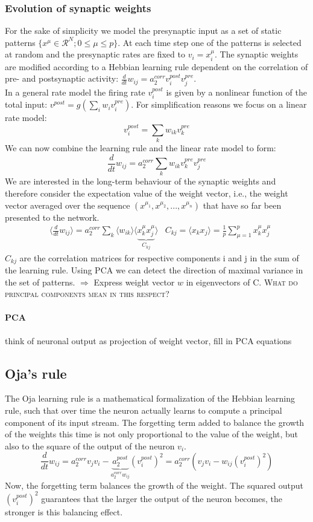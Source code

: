 \documentclass[11pt]{article}
\begin{document}
\subsubsection{Evolution of synaptic weights} For the sake of simplicity we model the presynaptic input as a set of static patterns $\{x^\mu \in \mathcal{R}^N; 0\leq \mu \leq p\}$. At each time step one of the patterns is selected at random and the presynaptic rates are fixed to $v_i = x_i^\mu$. The synaptic weights are modified according to a Hebbian learning rule dependent on the correlation of pre- and postsynaptic activity: $\frac{d}{dt}w_{ij}=a_2^{corr}v_i^{post}v_j^{pre}$.\\
In a general rate model the firing rate $v_i^{post}$ is given by a nonlinear function of the total input: $v^{post}=g(\sum_i w_i v_i^{pre})$. For simplification reasons we focus on a linear rate model: 
\[
v_i^{post}=\sum_k w_{ik} v_k^{pre}
\]
We can now combine the learning rule and the linear rate model to form:
\[
\frac{d}{dt}w_{ij}=a_2^{corr} \sum_k w_{ik} v_k^{pre} v_j^{pre}
\]
We are interested in the long-term behaviour of the synaptic weights and therefore consider the expectation value of the weight vector, i.e., the weight vector averaged over the sequence $(x^{\mu_1}, x^{\mu_2}, ..., x^{\mu_n})$ that have so far been presented to the network.
\begin{align*}
&\langle \frac{d}{dt}w_{ij} \rangle = a_2^{corr}\sum_k \langle w_{ik} \rangle \langle \underbrace{x_k^\mu x_j^\mu}_{C_{kj}} \rangle
&C_{kj}=\langle x_kx_j \rangle = \frac{1}{p}\sum_{\mu=1}^p x_k^\mu x_j^\mu
\end{align*}
$C_{kj}$ are the correlation matrices for respective components i and j in the sum of the learning rule. Using PCA we can detect the direction of maximal variance in the set of patterns. $\Rightarrow$ Express weight vector $w$ in eigenvectors of C. \textsc{What do principal components mean in this respect?}
\paragraph{PCA} think of neuronal output as projection of weight vector, fill in PCA equations
\subsection{Oja's rule}
The Oja learning rule is a mathematical formalization of the Hebbian learning rule, such that over time the neuron actually learns to compute a principal component of its input stream. The forgetting term added to balance the growth of the weights this time is not only proportional to the value of the weight, but also to the square of the output of the neuron $v_i$.
\[
\frac{d}{dt}w_{ij}=a_2^{corr}v_jv_i-\underbrace{a_2^{post}}_{a_2^{corr}w_{ij}}(v_i^{post})^2=a_2^{corr}(v_jv_i-w_{ij}(v_i^{post})^2)
\]
Now, the forgetting term balances the growth of the weight. The squared output $(v_i^{post})^2$ guarantees that the larger the output of the neuron becomes, the stronger is this balancing effect.
\end{document}
